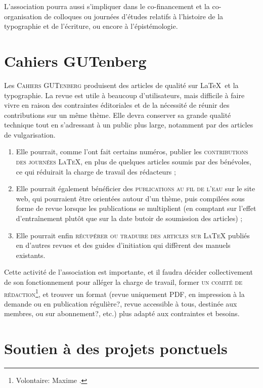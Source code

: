 \documentclass{tufte-handout}
\newcommand{\ratio}[3][]{\marginpar{\footnotesize{\textcolor{teal}{Temps requis: #2 / Utilité: #3}\par\noindent \textcolor{teal}{#1}}}}
\begin{document}
L’association pourra aussi s’impliquer dans le co-financement et la
co-organisation de colloques ou journées d’études relatifs à l’histoire de la
typographie et de l’écriture, ou encore à l’épistémologie.


\section{Cahiers GUTenberg}

Les \textsc{Cahiers GUTenberg}\ratio[Chronophage, mais utile à la communauté et
susceptible de bénéficier des autres projets]{++}{+++} produisent des articles
de qualité sur \LaTeX\ et la typographie. La revue est utile à beaucoup
d'utilisateurs, mais difficile à faire vivre en raison des contraintes
éditoriales et de la nécessité de réunir des contributions sur un même
thème. Elle devra conserver sa grande qualité technique tout en s'adressant à un
public plus large, notamment par des articles de vulgarisation.

\begin{enumerate}
\item Elle pourrait, comme l'ont fait certains numéros, publier les
  \textsc{contributions des journées \LaTeX}, en plus de quelques articles
  soumis par des bénévoles, ce qui réduirait la charge de travail des
  rédacteurs ;
\item Elle pourrait également bénéficier des \textsc{publications au fil de
    l'eau} sur le site web, qui pourraient être orientées autour d'un thème,
  puis compilées sous forme de revue lorsque les publications se multiplient (en
  comptant sur l'effet d'entraînement plutôt que sur la date butoir de
  soumission des articles) ;
\item Elle pourrait enfin \textsc{récupérer ou traduire des articles sur \LaTeX}
  publiés en d'autres revues et des guides d'initiation qui diffèrent des
  manuels existants.
\end{enumerate}

Cette activité de l'association est importante, et il faudra décider
collectivement de son fonctionnement pour alléger la charge de travail, former
\textsc{un comité de rédaction}\footnote{Volontaire: Maxime .}, et
trouver un format (revue uniquement PDF, en impression à la demande ou en
publication régulière?, revue accessible à tous, destinée aux membres, ou sur
abonnement?, etc.) plus adapté aux contraintes et besoins.


\section{Soutien à des projets ponctuels}
\end{document}
